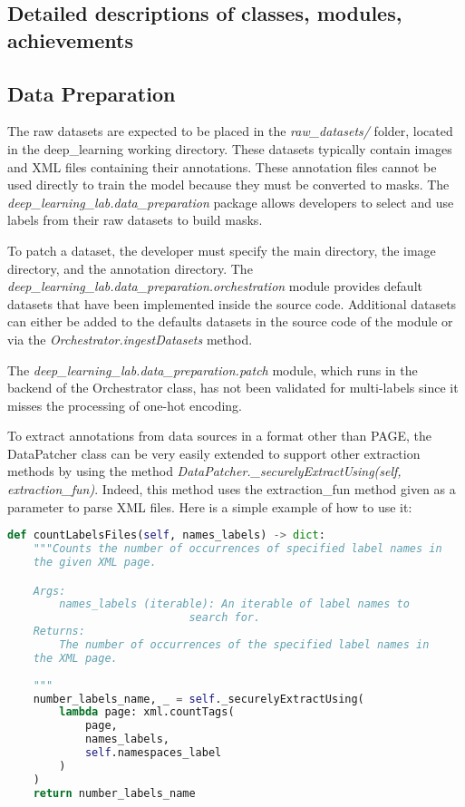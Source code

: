 \documentclass{polytech/polytech}
\numberwithin{figure}{chapter}
\begin{document}
\begin{appendix}
\section{Detailed descriptions of classes, modules, achievements}

\subsection{Data Preparation}
The raw datasets are expected to be placed in the {\it raw_datasets/} folder, located in the deep_learning working directory.
These datasets typically contain images and XML files containing their annotations.
These annotation files cannot be used directly to train the model because they must be converted to masks.
The {\it deep_learning_lab.data_preparation} package allows developers to select and use labels from their raw datasets to build masks.

To patch a dataset, the developer must specify the main directory, the image directory, and the annotation directory.
The {\it deep_learning_lab.data_preparation.orchestration} module provides default datasets that have been implemented inside the source code.
Additional datasets can either be added to the defaults datasets in the source code of the module or via the {\it Orchestrator.ingestDatasets} method.

The {\it deep_learning_lab.data_preparation.patch} module, which runs in the backend of the Orchestrator class, has not been validated for multi-labels since it misses the processing of one-hot encoding.

To extract annotations from data sources in a format other than PAGE, the DataPatcher class can be very easily extended to support other extraction methods by using the method {\it DataPatcher._securelyExtractUsing(self, extraction_fun)}.
Indeed, this method uses the extraction_fun method given as a parameter to parse XML files.
Here is a simple example of how to use it:
\begin{lstlisting}[language=Python]
def countLabelsFiles(self, names_labels) -> dict:
    """Counts the number of occurrences of specified label names in 
    the given XML page.

    Args:
        names_labels (iterable): An iterable of label names to
        				    search for.
    Returns:
        The number of occurrences of the specified label names in
	the XML page.
    
    """
    number_labels_name, _ = self._securelyExtractUsing(
        lambda page: xml.countTags(
            page,
            names_labels,
            self.namespaces_label
        )
    )
    return number_labels_name
\end{lstlisting}


\end{appendix}
\end{document}
